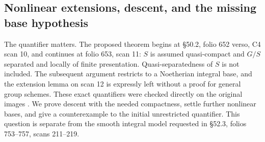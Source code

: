 \subsection{Nonlinear extensions, descent, and the missing base hypothesis}

The quantifier matters. The proposed theorem begins at \S50.2,
folio 652 verso, C4 scan 10, and continues at folio 653, scan 11:
$S$ is assumed quasi-compact and $G/S$ separated and locally of finite
presentation. Quasi-separatedness of $S$ is not included. The subsequent
argument restricts to a Noetherian integral base, and the extension lemma
on scan 12 is expressly left without a proof for general group schemes.
These exact quantifiers were checked directly on the original images
\citep[physical PDF pages 10--12, archive footers 9--11]{GrothendieckLM1404Original}.
We prove descent with the needed compactness, settle further nonlinear
bases, and give a counterexample to the initial unrestricted quantifier.
This question is separate from the smooth integral model requested in
\S52.3, folios 753--757, scans 211--219.


